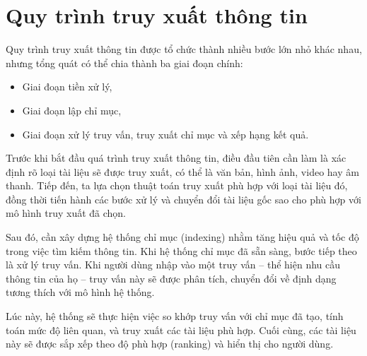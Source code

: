 \section{Quy trình truy xuất thông tin}
Quy trình truy xuất thông tin được tổ chức thành nhiều bước lớn nhỏ khác nhau, nhưng tổng quát có thể chia thành ba giai đoạn chính:

\begin{itemize}
    \item Giai đoạn tiền xử lý,
    \item Giai đoạn lập chỉ mục,
    \item Giai đoạn xử lý truy vấn, truy xuất chỉ mục và xếp hạng kết quả.
\end{itemize}

Trước khi bắt đầu quá trình truy xuất thông tin, điều đầu tiên cần làm là xác định rõ loại tài liệu sẽ được truy xuất, có thể là văn bản, hình ảnh, video hay âm thanh. Tiếp đến, ta lựa chọn thuật toán truy xuất phù hợp với loại tài liệu đó, đồng thời tiến hành các bước xử lý và chuyển đổi tài liệu gốc sao cho phù hợp với mô hình truy xuất đã chọn.

Sau đó, cần xây dựng hệ thống chỉ mục (indexing) nhằm tăng hiệu quả và tốc độ trong việc tìm kiếm thông tin. Khi hệ thống chỉ mục đã sẵn sàng, bước tiếp theo là xử lý truy vấn. Khi người dùng nhập vào một truy vấn -- thể hiện nhu cầu thông tin của họ -- truy vấn này sẽ được phân tích, chuyển đổi về định dạng tương thích với mô hình hệ thống.

Lúc này, hệ thống sẽ thực hiện việc so khớp truy vấn với chỉ mục đã tạo, tính toán mức độ liên quan, và truy xuất các tài liệu phù hợp. Cuối cùng, các tài liệu này sẽ được sắp xếp theo độ phù hợp (ranking) và hiển thị cho người dùng.




